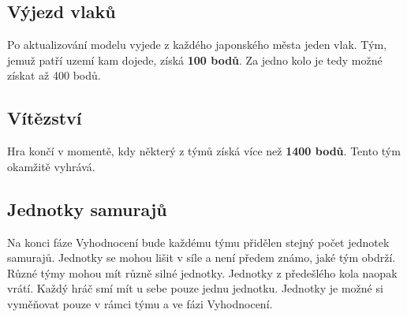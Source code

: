 \documentclass[11pt,a4paper,twocolumn, bold]{report}
\begin{document}
\subsection{Výjezd vlaků}
Po aktualizování modelu vyjede z každého japonského města jeden vlak. Tým, jemuž patří uzemí kam  dojede, získá \textbf{100 bodů}. Za jedno kolo je tedy možné získat až 400 bodů.

\subsection{Vítězství}
Hra končí v momentě, kdy některý z týmů získá více než \textbf{1400 bodů}. Tento tým okamžitě vyhrává.

\subsection{Jednotky samurajů}
Na konci fáze Vyhodnocení bude každému týmu přidělen stejný počet jednotek samurajů. Jednotky se mohou lišit v síle a není předem známo, jaké tým obdrží. Různé týmy mohou mít různě silné jednotky. Jednotky z předešlého kola naopak vrátí. Každý hráč smí mít u sebe pouze jednu jednotku. Jednotky je možné si vyměňovat pouze v rámci týmu a ve fázi Vyhodnocení.
\end{document}
